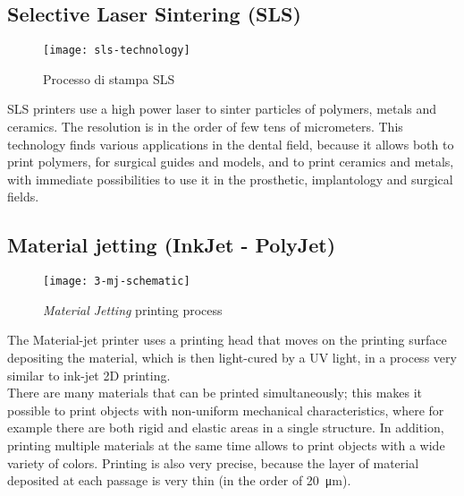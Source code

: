 \subsection{Selective Laser Sintering (SLS)}

\begin{wrapfigure} {R} {0.40\textwidth}
\vspace{-30pt}
	\begin{center}
	\texttt{[image: sls-technology]}
    \caption{Processo di stampa SLS}
    \label{fig:sls-technology}
    \end{center}
\vspace{-40pt}
\end{wrapfigure}

SLS printers use a high power laser to sinter particles of polymers, metals and ceramics. The resolution is in the order of few tens of micrometers. This technology finds various applications in the dental field, because it allows both to print polymers, for surgical guides and models, and to print ceramics and metals, with immediate possibilities to use it in the prosthetic, implantology and surgical fields.
\newpage

\subsection{Material jetting (InkJet - PolyJet)}

\begin{wrapfigure} {R} {0.5\textwidth}
\vspace{-20pt}
	\begin{center}
	\texttt{[image: 3-mj-schematic]}
    \caption{\emph{Material Jetting} printing process}
    \label{fig:3-mj-schematic}
    \end{center}
\vspace{-20pt}
\end{wrapfigure}

The Material-jet printer uses a printing head that moves on the printing surface depositing the material, which is then light-cured by a UV light, in a process very similar to ink-jet 2D printing. \\
There are many materials that can be printed simultaneously; this makes it possible to print objects with non-uniform mechanical characteristics, where for example there are both rigid and elastic areas in a single structure. In addition, printing multiple materials at the same time allows to print objects with a wide variety of colors. Printing is also very precise, because the layer of material deposited at each passage is very thin (in the order of \SI{20}{\micro\metre}).

